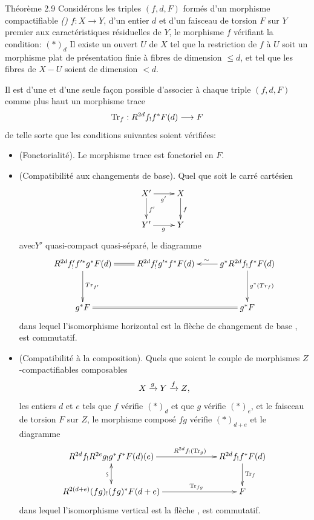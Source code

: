 \documentclass[10pt]{../fichiers-configuration-latex/smfart}
\begin{document}
\begin{enonce*}{Théorème 2.9}
Considérons les triples $(f,d,F)$ formés d'un morphisme compactifiable
\emph{()} $f:X\rightarrow Y$, d'un entier $d$ et
d'un faisceau 
de torsion $F$ sur $Y$ premier aux caractéristiques résiduelles de
$Y$, le morphisme $f$ vérifiant la condition: $(\ast)_{d}$ Il existe
un ouvert $U$ de $X$ tel que la restriction de $f$ à $U$ soit un
morphisme plat de présentation finie à fibres de dimension $\leq d$,
et tel que les fibres de $X-U$ soient de dimension $< d$.

Il est d'une et d'une seule façon possible d'associer à chaque
triple $(f,d,F)$ comme plus haut un morphisme trace
$$
\operatorname{Tr}_{f}:R^{2d}f_{!}f^{\ast}F(d)\longrightarrow F
$$
de telle sorte que les conditions suivantes soient vérifiées:
\begin{itemize}
\item[(Var 1)] (Fonctorialité). Le morphisme trace est fonctoriel en $F$.

\item[(Var 2)] (Compatibilité aux changements de base). Quel que soit
le carré cartésien
$$
\xymatrix{
X' \ar[r]_{g'}\ar[d]^{f'}& X\ar[d]^{f}\\
Y' \ar[r]_{g} & Y
}
$$
avec\pageoriginale $Y'$ quasi-compact quasi-séparé, le diagramme
$$
\xymatrix@R=1.25cm{
R^{2d}f'_!f'^{\ast}g^{\ast}F(d) \ar@{=}[r]\ar[d]^{Tr_{f'}}& R^{2d}f'_!
g'^{\ast} f^{\ast} F(d) & g^{\ast}
R^{2d}f_!f^{\ast} F(d) \ar[l]_{\sim} \ar[d]^{g^{\ast}(Tr_f)}\\
g^{\ast}F \ar@{=}[rr]&            & g^{\ast}F
}
$$
dans lequel l'isomorphisme horizontal est la flèche de changement de
base \emph{}, est commutatif.

\item[(Var 3)] (Compatibilité à la composition). Quels que soient le
couple de morphismes $Z$-compactifiables composables
$$
X\xrightarrow{g}Y\xrightarrow{f}Z{},
$$
les entiers $d$ et $e$ tels que $f$ vérifie $(\ast)_{d}$ et que $g$
vérifie $(\ast)_{e}$, et le faisceau de torsion $F$ sur $Z$, le
morphisme composé $fg$ vérifie $(\ast)_{d+e}$ et le diagramme
$$
\xymatrix@C=2.25cm{
R^{2d}f_! R^{2e} g_! g^{\ast} f^{\ast}F(d)(e) \ar@{<->}[d]_{\text{\rotatebox{90}{$\backsim$}}} \ar[r]^(.6){R^{2d}f_!(\Tr_g)} & 
R^{2d}f_! f^{\ast}F(d) \ar[d]^{\Tr_f}\\ 
R^{2(d+e)} (fg)_! (fg)^{\ast} F(d+e) \ar[r]^(.65){\Tr_{fg}} & F
}
$$
dans lequel l'isomorphisme vertical est la flèche , est
commutatif.


\end{itemize}
\end{enonce*}
\end{document}

